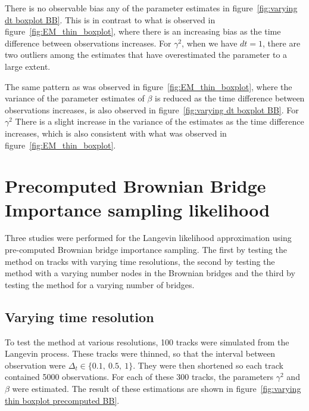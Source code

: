 There is no observable bias any of the parameter estimates in figure~\ref{fig:varying dt boxplot BB}. This is in contrast to what is observed in figure~\ref{fig:EM_thin_boxplot}, where there is an increasing bias as the time difference between observations increases. For $\gamma^2$, when we have $dt=1$, there are two outliers among the estimates that have overestimated the parameter to a large extent. 

The same pattern as was observed in figure~\ref{fig:EM_thin_boxplot}, where the variance of the parameter estimates of $\beta$ is reduced as the time difference between observations increases, is also observed in figure~\ref{fig:varying dt boxplot BB}. For $\gamma^2$ There is a slight increase in the variance of the estimates as the time difference increases, which is also consistent with what was observed in figure~\ref{fig:EM_thin_boxplot}.


\section{Precomputed Brownian Bridge Importance sampling likelihood}
Three studies were performed for the Langevin likelihood approximation using pre-computed Brownian bridge importance sampling. The first by testing the method on tracks with varying time resolutions, the second by testing the method with a varying number nodes in the Brownian bridges and the third by testing the method for a varying number of bridges.

\subsection{Varying time resolution}
To test the method at various resolutions, 100 tracks were simulated from the Langevin process. These tracks were thinned, so that the interval between observation were $\Delta_t \in \{0.1, \ 0.5, \ 1\}$. They were then shortened so each track contained 5000 observations. For each of these 300 tracks, the parameters $\gamma^2$ and $\beta$ were estimated. The result of these estimations are shown in figure~\ref{fig:varying thin boxplot precomputed BB}.

